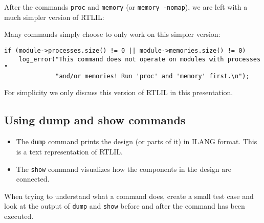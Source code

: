 \begin{frame}[fragile]{\subsecname}
After the commands {\tt proc} and {\tt memory} (or {\tt memory -nomap}), we are
left with a much simpler version of RTLIL:

\begin{center}
\end{center}

\bigskip
Many commands simply choose to only work on this simpler version:
\begin{lstlisting}[xleftmargin=0.5cm, basicstyle=\ttfamily\fontsize{8pt}{10pt}\selectfont]
if (module->processes.size() != 0 || module->memories.size() != 0)
    log_error("This command does not operate on modules with processes "
              "and/or memories! Run 'proc' and 'memory' first.\n");
\end{lstlisting}

\bigskip
For simplicity we only discuss this version of RTLIL in this presentation.
\end{frame}


\subsection{Using dump and show commands}

\begin{frame}{\subsecname}
\begin{itemize}
\item The {\tt dump} command prints the design (or parts of it) in ILANG format. This is
a text representation of RTLIL.

\bigskip
\item The {\tt show} command visualizes how the components in the design are connected.
\end{itemize}

\bigskip
When trying to understand what a command does, create a small test case and
look at the output of {\tt dump} and {\tt show} before and after the command
has been executed.
\end{frame}

